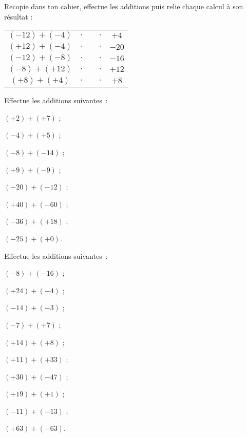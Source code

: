 

\begin{exercice}
Recopie dans ton cahier, effectue les additions puis relie chaque calcul à son résultat :
\begin{center}
 \begin{tabularx}{0.95\linewidth}{|cc|X|cc|}
  \cline{1-2}\cline{4-5}
  $(-12) + (-4)$ & $\cdot$ & & $\cdot$ & $+4$ \\ \cline{1-2}\cline{4-5}
  $(+12) + (-4)$ & $\cdot$ & & $\cdot$ & $-20$ \\ \cline{1-2}\cline{4-5}
  $(-12) + (-8)$ & $\cdot$ & & $\cdot$ & $-16$ \\ \cline{1-2}\cline{4-5}
  $(-8) + (+12)$ & $\cdot$ & & $\cdot$ & $+12$ \\ \cline{1-2}\cline{4-5}
  $(+8) + (+4)$ & $\cdot$ & & $\cdot$ & $+8$ \\ \cline{1-2}\cline{4-5}
  \end{tabularx}
  \end{center}
\end{exercice}

\begin{exercice}
Effectue les additions suivantes :
\begin{colenumerate}{2}
 \item $(+2) + (+7)$ ;
 \item $(-4) + (+5)$ ;
 \item $(-8) + (-14)$ ;
 \item $(+9) + (-9)$ ;
 \item $(-20) + (-12)$ ;
 \item $(+40) + (-60)$ ;
 \item $(-36) + (+18)$ ;
 \item $(-25) + (+0)$.
 \end{colenumerate}
\end{exercice}


\begin{exercice}
Effectue les additions suivantes :
\begin{colenumerate}{2}
 \item $(-8) + (-16)$ ;
 \item $(+24) + (-4)$ ;
 \item $(-14) + (-3)$ ;
 \item $(-7) + (+7)$ ;
 \item $(+14) + (+8)$ ;
 \item $(+11) + (+33)$ ;
 \item $(+30) + (-47)$ ;
 \item $(+19) + (+1)$ ;
 \item $(-11) + (-13)$ ;
 \item $(+63) + (-63)$.
 \end{colenumerate}
\end{exercice}


